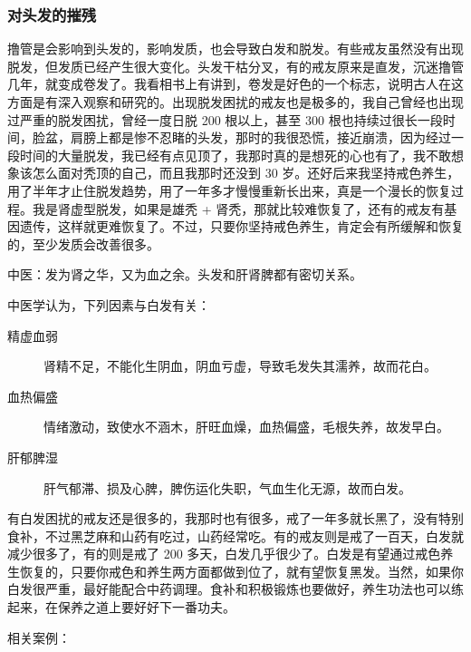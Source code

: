 \documentclass{ctexart}
\begin{document}
\subsubsection{对头发的摧残}

撸管是会影响到头发的，影响发质，也会导致白发和脱发。有些戒友虽然没有出现脱发，但发质已经产生很大变化。头发干枯分叉，有的戒友原来是直发，沉迷撸管几年，就变成卷发了。我看相书上有讲到，卷发是好色的一个标志，说明古人在这方面是有深入观察和研究的。出现脱发困扰的戒友也是极多的，我自己曾经也出现过严重的脱发困扰，曾经一度日脱 200 根以上，甚至 300 根也持续过很长一段时间，脸盆，肩膀上都是惨不忍睹的头发，那时的我很恐慌，接近崩溃，因为经过一段时间的大量脱发，我已经有点见顶了，我那时真的是想死的心也有了，我不敢想象该怎么面对秃顶的自己，而且我那时还没到 30 岁。还好后来我坚持戒色养生，用了半年才止住脱发趋势，用了一年多才慢慢重新长出来，真是一个漫长的恢复过程。我是肾虚型脱发，如果是雄秃 + 肾秃，那就比较难恢复了，还有的戒友有基因遗传，这样就更难恢复了。不过，只要你坚持戒色养生，肯定会有所缓解和恢复的，至少发质会改善很多。

中医：发为肾之华，又为血之余。头发和肝肾脾都有密切关系。

中医学认为，下列因素与白发有关：

\begin{description}
    \item[精虚血弱] 肾精不足，不能化生阴血，阴血亏虚，导致毛发失其濡养，故而花白。
    \item[血热偏盛] 情绪激动，致使水不涵木，肝旺血燥，血热偏盛，毛根失养，故发早白。
    \item[肝郁脾湿] 肝气郁滞、损及心脾，脾伤运化失职，气血生化无源，故而白发。
\end{description}

有白发困扰的戒友还是很多的，我那时也有很多，戒了一年多就长黑了，没有特别食补，不过黑芝麻和山药有吃过，山药经常吃。有的戒友则是戒了一百天，白发就减少很多了，有的则是戒了 200 多天，白发几乎很少了。白发是有望通过戒色养生恢复的，只要你戒色和养生两方面都做到位了，就有望恢复黑发。当然，如果你白发很严重，最好能配合中药调理。食补和积极锻炼也要做好，养生功法也可以练起来，在保养之道上要好好下一番功夫。

相关案例：
\end{document}
